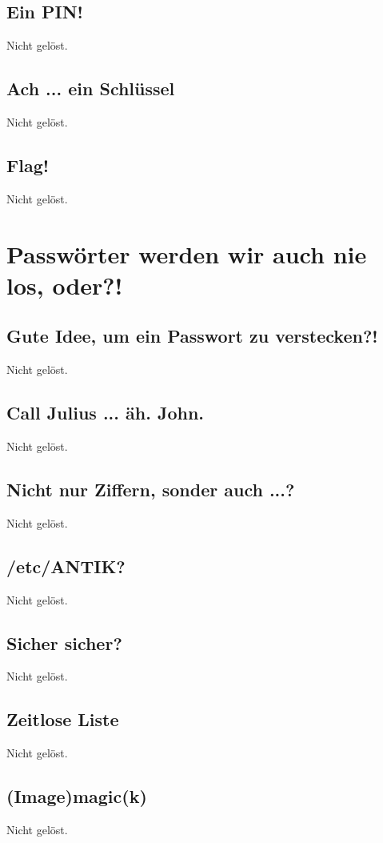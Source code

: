 \documentclass[12pt,a4paper,titlepage,oneside]{scrartcl}
\begin{document}
\subsection{Ein PIN!}
Nicht gelöst.

\subsection{Ach ... ein Schl\"ussel}
Nicht gelöst.

\subsection{Flag!}
Nicht gelöst.


\section{Passwörter werden wir auch nie los, oder?!}

\subsection{Gute Idee, um ein Passwort zu verstecken?!}
Nicht gelöst.

\subsection{Call Julius ... äh. John.}
Nicht gelöst.

\subsection{Nicht nur Ziffern, sonder auch ...?}
Nicht gelöst.

\subsection{/etc/ANTIK?}
Nicht gelöst.

\subsection{Sicher sicher?}
Nicht gelöst.

\subsection{Zeitlose Liste}
Nicht gelöst.

\subsection{(Image)magic(k)}
Nicht gelöst.
\end{document}
